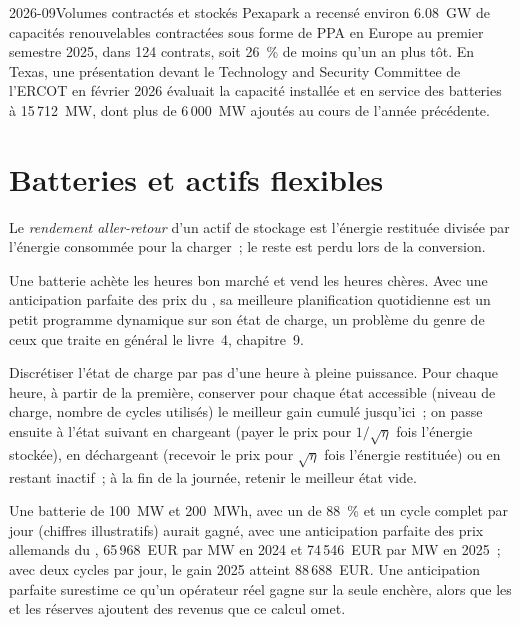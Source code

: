 \begin{dated}{2026-09}{Volumes contractés et stockés}\label{dat:m3:power-markets-trading:ppa}
Pexapark a recensé environ 6.08~GW de capacités renouvelables contractées sous forme de PPA en Europe au premier semestre 2025, dans 124 contrats, soit 26~\% de moins
qu'un an plus tôt. En Texas, une présentation devant le Technology and Security Committee de l'ERCOT en février 2026 évaluait la capacité installée et en service des batteries à
15\,712~MW, dont plus de 6\,000~MW ajoutés au cours de l'année précédente.
\end{dated}

\section{Batteries et actifs flexibles}

\begin{definition}\label{def:m3:power-markets-trading:rte}
Le \emph{rendement aller-retour} d'un actif de stockage est l'énergie
restituée divisée par l'énergie consommée pour la charger~; le reste est perdu lors de la conversion.
\end{definition}

Une batterie achète les heures bon marché et vend les heures chères. Avec une anticipation parfaite des prix du ,
sa meilleure planification quotidienne est un petit programme dynamique sur son état de charge, un problème du
genre de ceux que traite en général le livre~4, chapitre~9.

\begin{method}\label{met:m3:power-markets-trading:battery}
Discrétiser l'état de charge par pas d'une heure à pleine puissance. Pour chaque heure, à partir de la
première, conserver pour chaque état accessible (niveau de charge, nombre de cycles utilisés) le meilleur gain cumulé jusqu'ici~; on passe ensuite à l'état suivant
en chargeant (payer le prix pour $1/\sqrt{\eta}$ fois l'énergie stockée), en déchargeant (recevoir le
prix pour $\sqrt{\eta}$ fois l'énergie restituée) ou en restant inactif~; à la fin de la journée, retenir le
meilleur état vide.
\end{method}

Une batterie de 100~MW et 200~MWh, avec un  de 88~\% et un cycle complet par jour
(chiffres illustratifs) aurait gagné, avec une anticipation parfaite des prix allemands du
, 65\,968~EUR par MW en 2024 et 74\,546~EUR par MW en 2025~; avec deux cycles par jour,
le gain 2025 atteint 88\,688~EUR. Une anticipation parfaite surestime ce qu'un opérateur réel gagne sur la
seule enchère, alors que les  et les réserves ajoutent des revenus que ce calcul omet.

